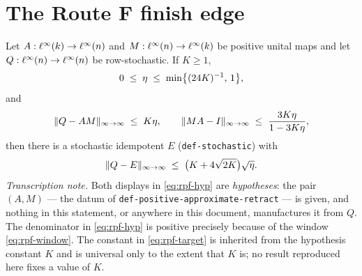 \section{The Route F finish edge}\label{sec:routef-prh-finish}

\begin{lemma}\label{lem:routef-prh-finish}
Let $A:\ell^{\infty}(k)\to\ell^{\infty}(n)$ and $M:\ell^{\infty}(n)\to\ell^{\infty}(k)$ be positive unital maps and let
$Q:\ell^{\infty}(n)\to\ell^{\infty}(n)$ be row-stochastic. If $K\ge1$,
\begin{equation}\label{eq:rpf-window}
  0\;\le\;\eta\;\le\;\min\bigl\{(24K)^{-1},\,1\bigr\},
\end{equation}
and
\begin{equation}\label{eq:rpf-hyp}
  \lVert Q-AM \rVert_{\infty\to\infty}\;\le\;K\eta,
  \qquad
  \lVert MA-I \rVert_{\infty\to\infty}\;\le\;\frac{3K\eta}{1-3K\eta},
\end{equation}
then there is a stochastic idempotent $E$ (\texttt{def-stochastic}) with
\begin{equation}\label{eq:rpf-target}
  \lVert Q-E \rVert_{\infty\to\infty}\;\le\;\bigl(K+4\sqrt{2K}\bigr)\sqrt{\eta}.
\end{equation}
\emph{Transcription note.} Both displays in \eqref{eq:rpf-hyp} are \emph{hypotheses}: the
pair $(A,M)$ --- the datum of \texttt{def-positive-approximate-retract} --- is given, and
nothing in this statement, or anywhere in this document, manufactures it from $Q$. The
denominator in \eqref{eq:rpf-hyp} is positive precisely because of the window
\eqref{eq:rpf-window}. The constant in \eqref{eq:rpf-target} is inherited from the
hypothesis constant $K$ and is universal only to the extent that $K$ is; no result
reproduced here fixes a value of $K$.
\end{lemma}

